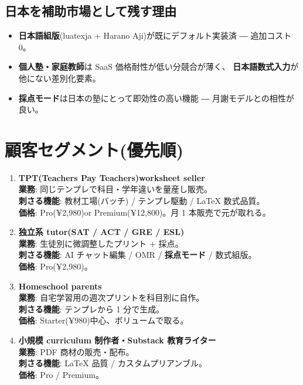 \documentclass{article}
\newcommand{\hl}[1]{\textcolor{cAlert}{\textbf{#1}}}
\begin{document}
\subsection*{日本を補助市場として残す理由}
\begin{itemize}[leftmargin=1.4em,itemsep=3pt]
  \item \textbf{日本語組版}(luatexja + Harano Aji)が既にデフォルト実装済 ―
        追加コスト 0。
  \item \textbf{個人塾・家庭教師}は SaaS 価格耐性が低い分競合が薄く、
        \hl{日本語数式入力}が他にない差別化要素。
  \item \textbf{採点モード}は日本の塾にとって即効性の高い機能 ― 月謝モデルとの相性が良い。
\end{itemize}

\section{顧客セグメント(優先順)}

\begin{tcolorbox}[colback=green!5,colframe=green!50!black,title=\textbf{主戦場: 英語圏 self-serve EdTech}]
\begin{enumerate}[leftmargin=1.4em,itemsep=4pt]
  \item \hl{TPT(Teachers Pay Teachers)worksheet seller}\\
        \textbf{業務}: 同じテンプレで科目・学年違いを量産し販売。\\
        \textbf{刺さる機能}: 教材工場(バッチ) / テンプレ駆動 / LaTeX 数式品質。\\
        \textbf{価格}: Pro(¥2,980)or Premium(¥12,800)。月 1 本販売で元が取れる。
  \item \hl{独立系 tutor(SAT / ACT / GRE / ESL)}\\
        \textbf{業務}: 生徒別に微調整したプリント + 採点。\\
        \textbf{刺さる機能}: AI チャット編集 / OMR / \hl{採点モード} / 数式組版。\\
        \textbf{価格}: Pro(¥2,980)。
  \item \hl{Homeschool parents}\\
        \textbf{業務}: 自宅学習用の週次プリントを科目別に自作。\\
        \textbf{刺さる機能}: テンプレから 1 分で生成。\\
        \textbf{価格}: Starter(¥980)中心、ボリュームで取る。
  \item \hl{小規模 curriculum 制作者・Substack 教育ライター}\\
        \textbf{業務}: PDF 商材の販売・配布。\\
        \textbf{刺さる機能}: LaTeX 品質 / カスタムプリアンブル。\\
        \textbf{価格}: Pro / Premium。
\end{enumerate}
\end{tcolorbox}
\end{document}
